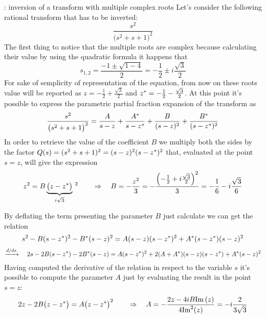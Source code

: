 	\begin{example}{: inversion of a transform with multiple complex roots}
		Let's consider the following rational transform that has to be inverted:
		\[ \frac{s^2}{\big(s^2 + s + 1\big)^2} \]
		The first thing to notice that the multiple roots are complex because calculating their value by using the quadratic formula it happens that
		\[ s_{1,2} = \frac{-1 \pm \sqrt{1-4}}{2} = -\frac 1 2 \pm i \frac{\sqrt 3}{2} \]
		For sake of semplicity of representation of the equation, from now on these roots value will be reported as $z = -\frac 1 2 + \frac{\sqrt 3}{2}$ and $z^* = -\frac 12 - \frac{\sqrt 3}{2}$. At this point it's possible to express  the parametric partial fraction expansion of the transform as
		\[ \frac{s^2}{\big(s^2 + s + 1\big)^2} = \frac{A}{s-z} + \frac{A^*}{s-z^*} + \frac{B}{(s-z)^2} + \frac{B^*}{(s-z^*)^2}\]
		In order to retrieve the value of the coefficient $B$ we multiply both the sides by the factor $Q(s) = (s^2+s+1)^2 = (s-z)^2(s-z^*)^2$ that, evaluated at the point $s =z $, will give the expression
		\[ z^2 = B \underbrace{\big(z-z^*\big)}_{i\sqrt 3} \, ^2 \qquad \Rightarrow \quad B = -\frac{z^2}{3} = - \frac{\left(-\frac 1 2  + i\frac{\sqrt 3}{2}\right)^2}{3} = - \frac 1 6  - i \frac{\sqrt 3}{6} \]
		
		By deflating the term presenting the parameter $B$ just calculate we can get the relation
		\[ s^2 - B(s-z^*)^2 - B^*(s-z)^2 = A(s-z)(s-z^*)^2 + A^* (s-z^*)(s-z)^2 \]
		\[ \xrightarrow{d/ds} \quad 2s -2B(s-z^*) - 2B^*(s-z) = A(s-z^*)^2 +2(A + A^*)(s-z)(s-z^*) + A^* (s-z)^2  \]
		Having computed the derivative of the relation in respect to the variable $s$ it's possible to compute the parameter $A$ just by evaluating the result in the point $s = z$:
		\[ 2z - 2B\big(z-z^*\big) = A \big(z-z^*\big)^2 \qquad \Rightarrow \quad A = -\frac{2z - 4iB \textrm{Im}\left(z\right)}{4\textrm{Im}^2(z)} = - i\frac{2}{3\sqrt 3} \]
	\end{example}
	
